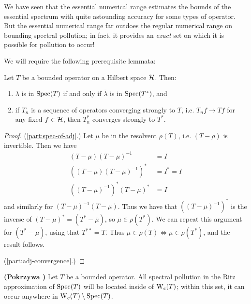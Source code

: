 \documentclass[../main.tex]{subfiles}
\begin{document}
We have seen that the essential numerical range estimates the bounds of the essential spectrum with quite astounding accuracy for some types of
operator. But the essential numerical range far outdoes the regular numerical range on bounding spectral pollution; in fact, it provides an \emph{exact} set on which it is possible for pollution to occur! 

We will require the following prerequisite lemmata:
\begin{lemma}\label{thm:adjoint-spec-props}
Let $T$ be a bounded operator on a Hilbert space $\mathcal{H}$. Then:
\begin{enumerate}
\item\label{part:spec-of-adj} $\lambda$ is in $\mathrm{Spec}(T)$ if and only if $\overline{\lambda}$ is in $\mathrm{Spec}(T^*)$, and
\item\label{part:adj-convergence} if $T_n$ is a sequence of operators converging strongly to $T$, i.e. $T_n f \rightarrow Tf$ for any fixed $f \in \mathcal{H}$, then $T_n^*$ converges strongly to $T^*$.
\end{enumerate}
\end{lemma}
\begin{proof}
(\ref{part:spec-of-adj}.) Let $\mu$ be in the resolvent $\rho(T)$, i.e. $(T - \rho)$ is invertible. Then we have
\begin{align*}
(T - \mu)(T - \mu)^{-1} & = I \\
((T - \mu)(T - \mu)^{-1})^* & = I^* = I \\
((T - \mu)^{-1})^*(T - \mu)^* & = I
\end{align*}
and similarly for $(T - \mu)^{-1}(T - \mu)$. Thus we have that $((T - \mu)^{-1})^*$ is the inverse of $(T - \mu)^* = (T^* - \overline{\mu})$, so $\overline{\mu} \in \rho(T^*)$. 
We can repeat this argument for $(T^* - \overline{\mu})$, using that $T^{**} = T$. Thus $\mu \in \rho(T) \Leftrightarrow \overline{\mu} \in \rho(T^*)$, and the result follows.

(\ref{part:adj-convergence}.) %
\end{proof}

\begin{theorem}{\textbf{(Pokrzywa \cite{pokrzywa1979method})}}
Let $T$ be a bounded operator. All spectral pollution in the Ritz approximation of $\mathrm{Spec}(T)$ will be located inside of $\mathrm{W}_e(T)$; within this set, it can occur anywhere in $\mathrm{W}_e(T) \setminus \mathrm{Spec}(T)$.
\end{theorem}
\end{document}
